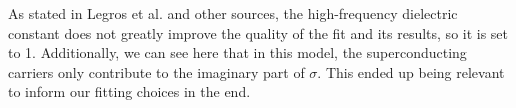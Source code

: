 As stated in Legros et al. and other sources, 
the high-frequency dielectric constant does not greatly improve the quality of the fit and its results, so it is set to 1.
Additionally, we can see here that in this model, the superconducting carriers only contribute to the imaginary part of $\sigma$. 
This ended up being relevant to inform our fitting choices in the end.


